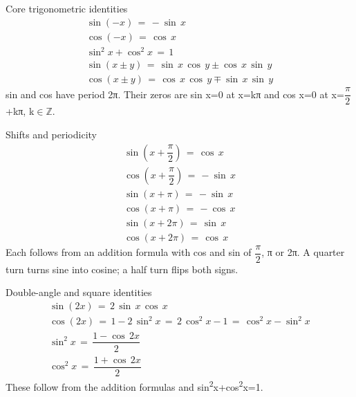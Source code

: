 \documentclass[11pt]{article}
\begin{document}
\begin{keepsection}
\begin{keepsection}
\begin{equationcard}{Core trigonometric identities}
\[ \begin{gathered} \sin (-{x})\, =\, -\sin \, {x} \\ \cos (-{x})\, =\, \cos \, {x} \\ \sin ^{2}{x}+\cos ^{2}{x}\, =\, 1 \\ \sin ({x}\pm {y})\, =\, \sin \, {x}\, \cos \, {y}\pm \cos \, {x}\, \sin \, {y} \\ \cos ({x}\pm {y})\, =\, \cos \, {x}\, \cos \, {y}\mp \sin \, {x}\, \sin \, {y} \end{gathered} \]
{\small sin and cos have period 2π. Their zeros are sin x=0 at x=kπ and cos x=0 at x={\small\ensuremath{\dfrac{π}{2}}}+kπ, k\ensuremath{\in}\ensuremath{\mathbb{Z}}.}
\end{equationcard}

\begin{equationcard}{Shifts and periodicity}
\[ \begin{gathered} \sin \left({x}+\dfrac{π}{2}\right)\, =\, \cos \, {x} \\ \cos \left({x}+\dfrac{π}{2}\right)\, =\, -\sin \, {x} \\ \sin ({x}+π)\, =\, -\sin \, {x} \\ \cos ({x}+π)\, =\, -\cos \, {x} \\ \sin ({x}+2π)\, =\, \sin \, {x} \\ \cos ({x}+2π)\, =\, \cos \, {x} \end{gathered} \]
{\small Each follows from an addition formula with cos and sin of {\small\ensuremath{\dfrac{π}{2}}}, π or 2π. A quarter turn turns sine into cosine; a half turn flips both signs.}
\end{equationcard}

\begin{equationcard}{Double-angle and square identities}
\[ \begin{gathered} \sin (2{x})\, =\, 2\, \sin \, {x}\, \cos \, {x} \\ \cos (2{x})\, =\, 1-2\, \sin ^{2}{x}\, =\, 2\, \cos ^{2}{x}-1\, =\, \cos ^{2}{x}-\sin ^{2}{x} \\ \sin ^{2}{x}\, =\, \dfrac{1-\cos \, 2{x}}{2} \\ \cos ^{2}{x}\, =\, \dfrac{1+\cos \, 2{x}}{2} \end{gathered} \]
{\small These follow from the addition formulas and sin\textsuperscript{2}x+cos\textsuperscript{2}x=1.}
\end{equationcard}


\end{keepsection}
\end{keepsection}
\end{document}
